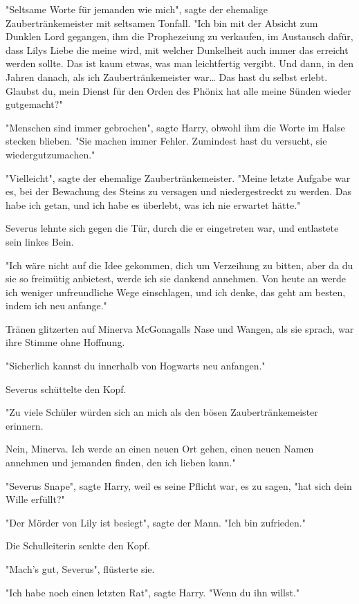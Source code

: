 {"Seltsame Worte für jemanden wie mich", sagte der ehemalige Zaubertränkemeister mit seltsamen Tonfall. "Ich bin mit der Absicht zum Dunklen Lord gegangen, ihm die Prophezeiung zu verkaufen, im Austausch dafür, dass Lilys Liebe die meine wird, mit welcher Dunkelheit auch immer das erreicht werden sollte. Das ist kaum etwas, was man leichtfertig vergibt. Und dann, in den Jahren danach, als ich Zaubertränkemeister war… Das hast du selbst erlebt. Glaubst du, mein Dienst für den Orden des Phönix hat alle meine Sünden wieder gutgemacht?"

"Menschen sind immer gebrochen", sagte Harry, obwohl ihm die Worte im Halse stecken blieben. "Sie machen immer Fehler. Zumindest hast du versucht, sie wiedergutzumachen."

"Vielleicht", sagte der ehemalige Zaubertränkemeister. "Meine letzte Aufgabe war es, bei der Bewachung des Steins zu versagen und niedergestreckt zu werden. Das habe ich getan, und ich habe es überlebt, was ich nie erwartet hätte."

Severus lehnte sich gegen die Tür, durch die er eingetreten war, und entlastete sein linkes Bein.

"Ich wäre nicht auf die Idee gekommen, dich um Verzeihung zu bitten, aber da du sie so freimütig anbietest, werde ich sie dankend annehmen. Von heute an werde ich weniger unfreundliche Wege einschlagen, und ich denke, das geht am besten, indem ich neu anfange."

Tränen glitzerten auf Minerva McGonagalls Nase und Wangen, als sie sprach, war ihre Stimme ohne Hoffnung.

"Sicherlich kannst du innerhalb von Hogwarts neu anfangen."

Severus schüttelte den Kopf.

"Zu viele Schüler würden sich an mich als den bösen Zaubertränkemeister erinnern.

Nein, Minerva. Ich werde an einen neuen Ort gehen, einen neuen Namen annehmen und jemanden finden, den ich lieben kann."

"Severus Snape", sagte Harry, weil es seine Pflicht war, es zu sagen, "hat sich dein Wille erfüllt?"

"Der Mörder von Lily ist besiegt", sagte der Mann. "Ich bin zufrieden."

Die Schulleiterin senkte den Kopf.

"Mach's gut, Severus", flüsterte sie.

"Ich habe noch einen letzten Rat", sagte Harry. "Wenn du ihn willst."

}

